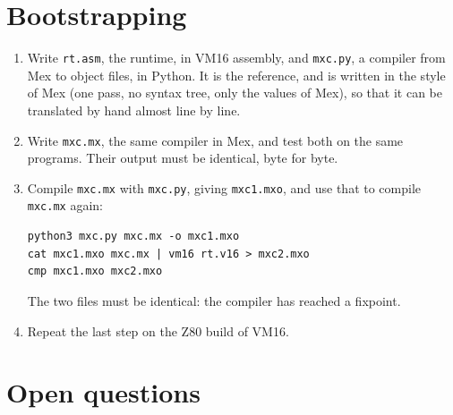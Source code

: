 \documentclass[11pt,a4paper]{article}
\newcommand{\lang}{Mex}
\newcommand{\vm}{VM16}
\begin{document}
\section{Bootstrapping}\label{sec:bootstrap}

\begin{enumerate}[nosep]
\item Write \texttt{rt.asm}, the runtime, in \vm{} assembly, and
  \texttt{mxc.py}, a compiler from \lang{} to object files, in Python. It is
  the reference, and is written in the style of \lang{} (one pass, no syntax
  tree, only the values of \lang), so that it can be translated by hand
  almost line by line.
\item Write \texttt{mxc.mx}, the same compiler in \lang{}, and test both on
  the same programs. Their output must be identical, byte for byte.
\item Compile \texttt{mxc.mx} with \texttt{mxc.py}, giving
  \texttt{mxc1.mxo}, and use that to compile \texttt{mxc.mx} again:
\begin{lstlisting}[style=shell]
python3 mxc.py mxc.mx -o mxc1.mxo
cat mxc1.mxo mxc.mx | vm16 rt.v16 > mxc2.mxo
cmp mxc1.mxo mxc2.mxo
\end{lstlisting}
  The two files must be identical: the compiler has reached a fixpoint.
\item Repeat the last step on the Z80 build of \vm{}.
\end{enumerate}

\section{Open questions}
\end{document}

